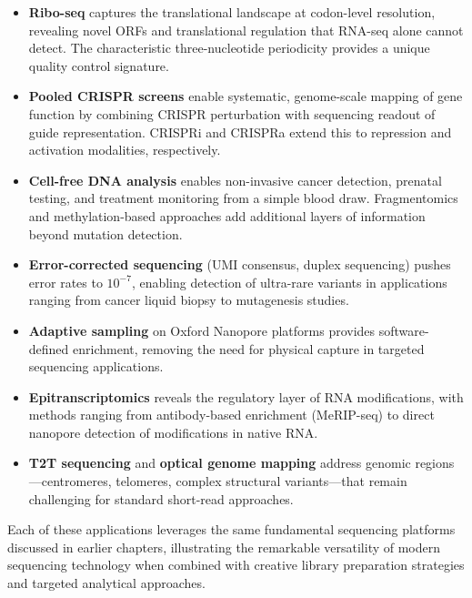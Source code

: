\begin{itemize}[itemsep=3pt]
  \item \textbf{Ribo-seq} captures the translational landscape at codon-level resolution, revealing novel ORFs and translational regulation that RNA-seq alone cannot detect. The characteristic three-nucleotide periodicity provides a unique quality control signature.
  \item \textbf{Pooled CRISPR screens} enable systematic, genome-scale mapping of gene function by combining CRISPR perturbation with sequencing readout of guide representation. CRISPRi and CRISPRa extend this to repression and activation modalities, respectively.
  \item \textbf{Cell-free DNA analysis} enables non-invasive cancer detection, prenatal testing, and treatment monitoring from a simple blood draw. Fragmentomics and methylation-based approaches add additional layers of information beyond mutation detection.
  \item \textbf{Error-corrected sequencing} (UMI consensus, duplex sequencing) pushes error rates to $10^{-7}$, enabling detection of ultra-rare variants in applications ranging from cancer liquid biopsy to mutagenesis studies.
  \item \textbf{Adaptive sampling} on Oxford Nanopore platforms provides software-defined enrichment, removing the need for physical capture in targeted sequencing applications.
  \item \textbf{Epitranscriptomics} reveals the regulatory layer of RNA modifications, with methods ranging from antibody-based enrichment (MeRIP-seq) to direct nanopore detection of modifications in native RNA.
  \item \textbf{T2T sequencing} and \textbf{optical genome mapping} address genomic regions---centromeres, telomeres, complex structural variants---that remain challenging for standard short-read approaches.
\end{itemize}

Each of these applications leverages the same fundamental sequencing platforms discussed in earlier chapters, illustrating the remarkable versatility of modern sequencing technology when combined with creative library preparation strategies and targeted analytical approaches.

